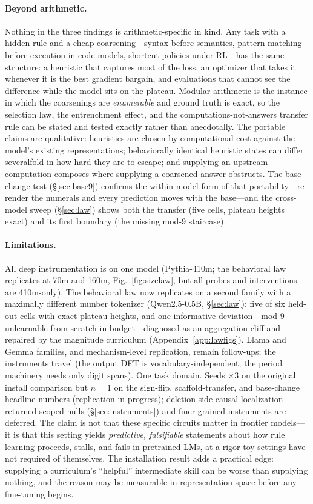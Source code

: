 \documentclass{article} %
\begin{document}
\paragraph{Beyond arithmetic.} Nothing in the three findings is arithmetic-specific in kind. Any task with a hidden rule and a cheap coarsening---syntax before semantics, pattern-matching before execution in code models, shortcut policies under RL---has the same structure: a heuristic that captures most of the loss, an optimizer that takes it whenever it is the best gradient bargain, and evaluations that cannot see the difference while the model sits on the plateau. Modular arithmetic is the instance in which the coarsenings are \emph{enumerable} and ground truth is exact, so the selection law, the entrenchment effect, and the computations-not-answers transfer rule can be stated and tested exactly rather than anecdotally. The portable claims are qualitative: heuristics are chosen by computational cost against the model's existing representations; behaviorally identical heuristic states can differ severalfold in how hard they are to escape; and supplying an upstream computation composes where supplying a coarsened answer obstructs. The base-change test (\S\ref{sec:base9}) confirms the within-model form of that portability---re-render the numerals and every prediction moves with the base---and the cross-model sweep (\S\ref{sec:law}) shows both the transfer (five cells, plateau heights exact) and its first boundary (the missing mod-9 staircase).

\paragraph{Limitations.} All deep instrumentation is on one model (Pythia-410m; the behavioral law replicates at 70m and 160m, Fig.~\ref{fig:sizelaw}, but all probes and interventions are 410m-only). The behavioral law now replicates on a second family with a maximally different number tokenizer (Qwen2.5-0.5B, \S\ref{sec:law}): five of six held-out cells with exact plateau heights, and one informative deviation---mod 9 unlearnable from scratch in budget---diagnosed as an aggregation cliff and repaired by the magnitude curriculum (Appendix~\ref{app:lawfigs}). Llama and Gemma families, and mechanism-level replication, remain follow-ups; the instruments travel (the output DFT is vocabulary-independent; the period machinery needs only digit spans). One task domain. Seeds $\times 3$ on the original install comparison but $n{=}1$ on the sign-flip, scaffold-transfer, and base-change headline numbers (replication in progress); deletion-side causal localization returned scoped nulls (\S\ref{sec:instruments}) and finer-grained instruments are deferred. The claim is not that these specific circuits matter in frontier models---it is that this setting yields \emph{predictive, falsifiable} statements about how rule learning proceeds, stalls, and fails in pretrained LMs, at a rigor toy settings have not required of themselves. The installation result adds a practical edge: supplying a curriculum's ``helpful'' intermediate skill can be worse than supplying nothing, and the reason may be measurable in representation space before any fine-tuning begins.
\end{document}
